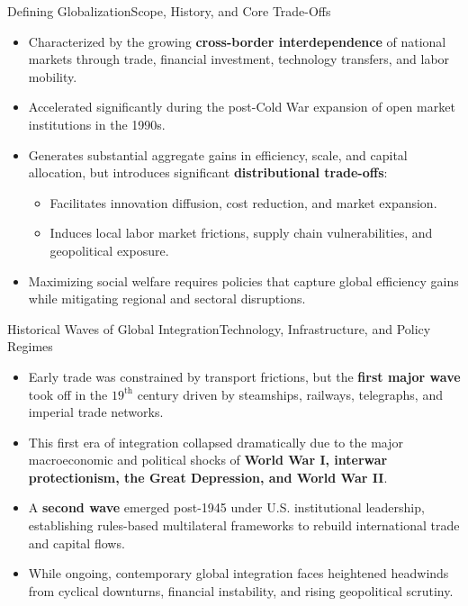 \documentclass[10pt, aspectratio=169]{beamer}
\begin{document}
	\begin{frame}{Defining Globalization}{Scope, History, and Core Trade-Offs}
		\begin{itemize}
			\item Characterized by the growing \textbf{cross-border interdependence} of national markets through trade, financial investment, technology transfers, and labor mobility.
			\vspace{0.25cm}
			\item Accelerated significantly during the post-Cold War expansion of open market institutions in the 1990s.
			\vspace{0.25cm}
			\item Generates substantial aggregate gains in efficiency, scale, and capital allocation, but introduces significant \textbf{distributional trade-offs}:
			\begin{itemize}
				\vspace{0.1cm}
				\item Facilitates innovation diffusion, cost reduction, and market expansion.
				\item Induces local labor market frictions, supply chain vulnerabilities, and geopolitical exposure.
			\end{itemize}
			\vspace{0.25cm}
			\item Maximizing social welfare requires policies that capture global efficiency gains while mitigating regional and sectoral disruptions.
		\end{itemize}
	\end{frame}
	
	\begin{frame}{Historical Waves of Global Integration}{Technology, Infrastructure, and Policy Regimes}
		\begin{itemize}
			\item Early trade was constrained by transport frictions, but the \textbf{first major wave} took off in the $19^{\text{th}}$ century driven by steamships, railways, telegraphs, and imperial trade networks.
			\vspace{0.25cm}
			\item This first era of integration collapsed dramatically due to the major macroeconomic and political shocks of \textbf{World War I, interwar protectionism, the Great Depression, and World War II}.
			\vspace{0.25cm}
			\item A \textbf{second wave} emerged post-1945 under U.S. institutional leadership, establishing rules-based multilateral frameworks to rebuild international trade and capital flows.
			\vspace{0.25cm}
			\item While ongoing, contemporary global integration faces heightened headwinds from cyclical downturns, financial instability, and rising geopolitical scrutiny.
		\end{itemize}
	\end{frame}
	
\end{document}
